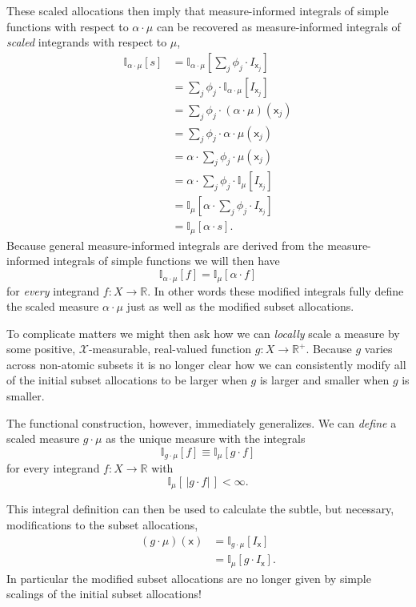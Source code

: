 \documentclass[
  letterpaper,
  DIV=11,
  numbers=noendperiod]{scrartcl}
\begin{document}
These scaled allocations then imply that measure-informed integrals of
simple functions with respect to \(\alpha \cdot \mu\) can be recovered
as measure-informed integrals of \emph{scaled} integrands with respect
to \(\mu\), \begin{align*}
\mathbb{I}_{\alpha \cdot \mu} [ s ]
&=
\mathbb{I}_{\alpha \cdot \mu}
\left[ \sum_{j} \phi_{j} \cdot I_{\mathsf{x}_{j}} \right]
\\
&=
\sum_{j} \phi_{j} \cdot
\mathbb{I}_{\alpha \cdot \mu} [ I_{\mathsf{x}_{j}} ]
\\
&=
\sum_{j} \phi_{j} \cdot (\alpha \cdot \mu)(\mathsf{x}_{j})
\\
&=
\sum_{j} \phi_{j} \cdot \alpha \cdot \mu(\mathsf{x}_{j})
\\
&=
\alpha \cdot \sum_{j} \phi_{j} \cdot \mu(\mathsf{x}_{j})
\\
&=
\alpha \cdot \sum_{j} \phi_{j} \cdot
\mathbb{I}_{\mu}
[ I_{\mathsf{x}_{j}} ]
\\
&=
\mathbb{I}_{\mu}
\left[ \alpha \cdot \sum_{j} \phi_{j} \cdot I_{\mathsf{x}_{j}} \right]
\\
&=
\mathbb{I}_{\mu} [ \alpha \cdot s ].
\end{align*} Because general measure-informed integrals are derived from
the measure-informed integrals of simple functions we will then have \[
\mathbb{I}_{\alpha \cdot \mu} [ f ] = \mathbb{I}_{\mu} [ \alpha \cdot f ]
\] for \emph{every} integrand \(f: X \rightarrow \mathbb{R}\). In other
words these modified integrals fully define the scaled measure
\(\alpha \cdot \mu\) just as well as the modified subset allocations.

To complicate matters we might then ask how we can \emph{locally} scale
a measure by some positive, \(\mathcal{X}\)-measurable, real-valued
function \(g: X \rightarrow \mathbb{R}^{+}\). Because \(g\) varies
across non-atomic subsets it is no longer clear how we can consistently
modify all of the initial subset allocations to be larger when \(g\) is
larger and smaller when \(g\) is smaller.

The functional construction, however, immediately generalizes. We can
\emph{define} a scaled measure \(g \cdot \mu\) as the unique measure
with the integrals \[
\mathbb{I}_{g \cdot \mu} [ f ] \equiv \mathbb{I}_{\mu} [ g \cdot f ]
\] for every integrand \(f: X \rightarrow \mathbb{R}\) with \[
\mathbb{I}_{\mu} [ \, | g \cdot f | \, ] < \infty.
\]

This integral definition can then be used to calculate the subtle, but
necessary, modifications to the subset allocations, \begin{align*}
(g \cdot \mu)(\mathsf{x})
&=
\mathbb{I}_{g \cdot \mu} [ I_{\mathsf{x}} ]
\\
&=
\mathbb{I}_{\mu} [ g \cdot I_{\mathsf{x}} ].
\end{align*} In particular the modified subset allocations are no longer
given by simple scalings of the initial subset allocations!
\end{document}
